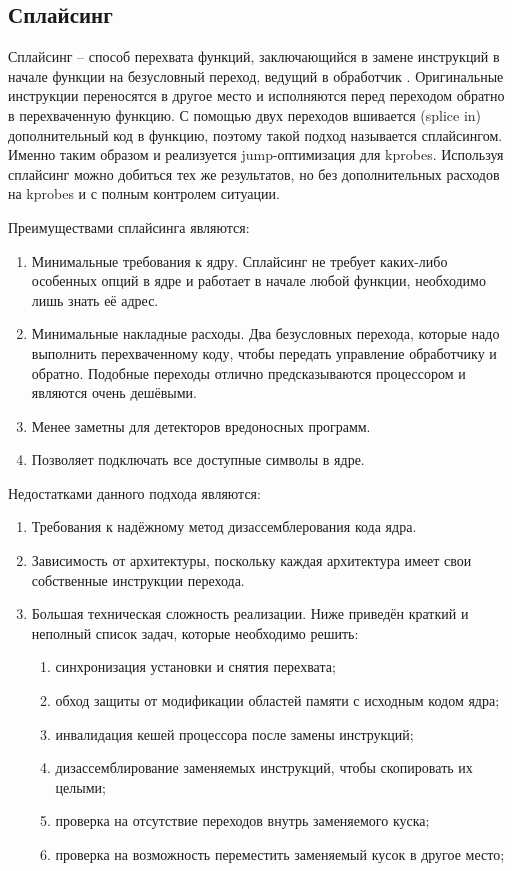 	\subsection*{Сплайсинг}
		Сплайсинг -- способ перехвата функций, заключающийся в замене инструкций в начале функции
		на безусловный переход, ведущий в обработчик \cite{splice-hooking}. 
		Оригинальные инструкции переносятся в другое место и исполняются перед переходом обратно в перехваченную функцию.
		С помощью двух переходов вшивается (splice in) дополнительный код в функцию, поэтому такой подход называется сплайсингом.
		Именно таким образом и реализуется jump-оптимизация для kprobes. 
		Используя сплайсинг можно добиться тех же результатов, но без дополнительных расходов на kprobes и с полным контролем ситуации.
		
		Преимуществами сплайсинга являются:
		\begin{enumerate}
			\item Минимальные требования к ядру. 
				Сплайсинг не требует каких-либо особенных опций в ядре и работает в начале любой функции, 
				необходимо лишь знать её адрес.
			\item Минимальные накладные расходы. 
				Два безусловных перехода, которые надо выполнить перехваченному коду, чтобы передать управление обработчику и обратно.
				Подобные переходы отлично предсказываются процессором и являются очень дешёвыми.
			\item Менее заметны для детекторов вредоносных программ.
			\item Позволяет подключать все доступные символы в ядре.
		\end{enumerate}
		
		Недостатками данного подхода являются:
		\begin{enumerate}
			\item Требования к надёжному метод дизассемблерования кода ядра.
			\item Зависимость от архитектуры, поскольку каждая архитектура имеет свои собственные инструкции перехода.
			\item Большая техническая сложность реализации. Ниже приведён краткий и неполный список задач, которые необходимо решить:
			\begin{enumerate}
				\item синхронизация установки и снятия перехвата;
				\item обход защиты от модификации областей памяти с исходным кодом ядра;
				\item инвалидация кешей процессора после замены инструкций;
				\item дизассемблирование заменяемых инструкций, чтобы скопировать их целыми;
				\item проверка на отсутствие переходов внутрь заменяемого куска;
				\item проверка на возможность переместить заменяемый кусок в другое место;
			\end{enumerate}
		\end{enumerate}

